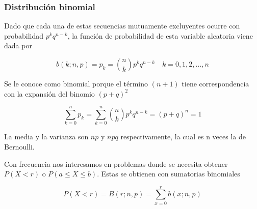 \documentclass[spanish]{beamer}
\begin{document}
\begin{frame}
\frametitle{Distribución binomial}

Dado que cada una de estas secuencias mutuamente excluyentes ocurre con probabilidad $p^k q^{n - k}$, la función de probabilidad de esta variable aleatoria viene dada por


$$
b(k; n, p) = p_{k}=\binom{n}{k}p^k q^{n - k} \quad k=0,1,2,\ldots,n
$$


Se le conoce como binomial porque el término $(n+1)$ tiene correspondencia con la expansión del binomio $(p+q)^2$

$$
\displaystyle \sum_{k=0}^{n}{p_{k}}= \sum_{k=0}^{n} \binom{n}{k}p^k q^{n - k}= (p+q)^n=1 
$$

La media y la varianza son $np$ y $npq$ respectivamente, la cual es n veces la de Bernoulli.

Con frecuencia nos interesamos en problemas donde se necesita obtener $P(X < r) \text{ o } P(a \leq X \leq b)$. Estas se obtienen con sumatorias binomiales

$$
P(X < r)= B (r; n, p) =\displaystyle \sum_{x=0}^{r} b(x; n, p)
$$

\end{frame}
\end{document}
